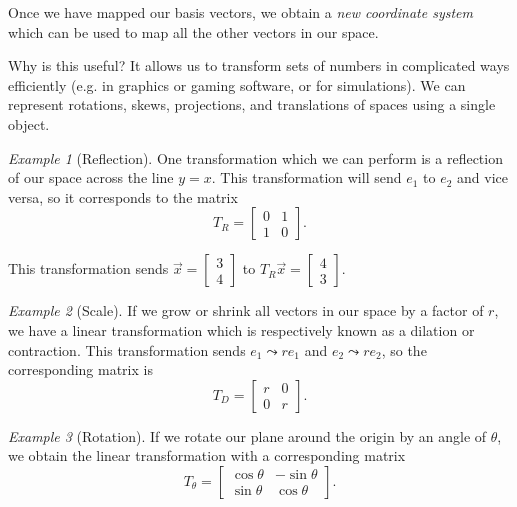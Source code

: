 \documentclass[10pt, a4paper]{amsart}
\theoremstyle{definition}
\theoremstyle{remark}
\newtheorem{ex}{Example}
\begin{document}
Once we have mapped our basis vectors, we obtain a \emph{new coordinate system} which can
be used to map all the other vectors in our space.

Why is this useful? It allows us to transform sets of numbers in complicated ways efficiently
(e.g. in graphics or gaming software, or for simulations). We can represent rotations, skews,
projections, and translations of spaces using a single object.

\begin{ex}[Reflection]
  One transformation which we can perform is a reflection of our space across the line $ y = x $.
  This transformation will send $ e_1 $ to $ e_2 $ and vice versa, so it corresponds to the matrix
  \begin{displaymath}
    T_R = \begin{bmatrix} 0 & 1 \\ 1 & 0 \end{bmatrix}.
  \end{displaymath}

  This transformation sends $ \vec{x} = \begin{bmatrix} 3 \\ 4 \end{bmatrix} $ to $ T_R \vec{x} = \begin{bmatrix} 4 \\ 3 \end{bmatrix} $.
\end{ex}

\begin{ex}[Scale]
  If we grow or shrink all vectors in our space by a factor of $ r $, we have a linear transformation which
  is respectively known as a dilation or contraction. This transformation sends $ e_1 \leadsto re_1 $
  and $ e_2 \leadsto re_2 $, so the corresponding matrix is
  \begin{displaymath}
    T_D = \begin{bmatrix} r & 0 \\ 0 & r \end{bmatrix}.
  \end{displaymath}
\end{ex}

\begin{ex}[Rotation]
  If we rotate our plane around the origin by an angle of $ \theta $, we obtain the linear
  transformation with a corresponding matrix
  \begin{displaymath}
    T_\theta = \begin{bmatrix} \cos \theta & -\sin \theta \\ \sin \theta & \cos \theta \end{bmatrix}.
  \end{displaymath}
\end{ex}
\end{document}
